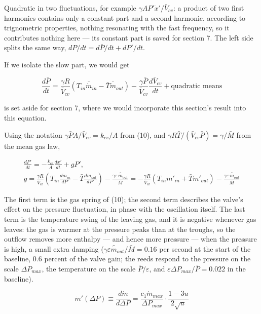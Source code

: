 \documentclass[11pt]{article}
\begin{document}
Quadratic in two fluctuations, for example $\gamma AP'\dot x'/\bar V_{cv}$: a product of two first harmonics contains only a constant part and a second harmonic, according to trignometric properties, nothing resonating with the fast frequency, so it contributes nothing here --- its constant part is saved for section 7. The left side splits the same way, $dP/dt = d\bar P/dt + dP'/dt$.

If we isolate the slow part, we would get

\[
\frac{d\bar P}{dt} = \frac{\gamma R}{\bar V_{cv}}\left(T_{in}\bar {\dot{m}}_{in} - \bar T\bar {\dot{m}}_{out}\right) - \frac{\gamma\bar P}{\bar V_{cv}}\frac{d\bar V_{cv}}{dt} + \text{quadratic means}
\]

is set aside for section 7, where we would incorporate this section's result into this equation.

Using the notation $\gamma\bar PA/\bar V_{cv} = k_{cv}/A$ from (10), and $\gamma R\bar T/(\bar V_{cv}\bar P) = \gamma/\bar M$ from the mean gas law,

\begin{equation}
\begin{gathered}
\frac{dP'}{dt} = -\frac{k_{cv}}{A}\frac{dx'}{dt} + gP', \\
g = \frac{\gamma R}{\bar V_{cv}}\left(T_{in}\frac{d\dot{m}_{in}}{dP'} - \bar T\frac{d\dot{m}_{out}}{dP'}\right) - \frac{\gamma\varepsilon\,\bar{\dot m}_{out}}{\bar M}
= -\frac{\gamma R}{\bar V_{cv}}\left(T_{in}\dot m'_{in} + \bar T\dot m'_{out}\right) - \frac{\gamma\varepsilon\,\bar{\dot m}_{out}}{\bar M}
\end{gathered} \tag{14}
\end{equation}

The first term is the gas spring of (10); the second term describes the valve's effect on the pressure fluctuation, in phase with the oscillation itself. The last term is the temperature swing of the leaving gas, and it is negative whenever gas leaves: the gas is warmer at the pressure peaks than at the troughs, so the outflow removes more enthalpy --- and hence more pressure --- when the pressure is high, a small extra damping ($\gamma\varepsilon\bar{\dot m}_{out}/\bar M = 0.16$ per second at the start of the baseline, 0.6 percent of the valve gain; the reeds respond to the pressure on the scale $\Delta P_{max}$, the temperature on the scale $\bar P/\varepsilon$, and $\varepsilon\Delta P_{max}/\bar P = 0.022$ in the baseline).

\begin{equation}
\dot m'(\Delta P) \equiv \frac{d\dot m}{d\Delta P} = \frac{c_1\dot m_{max}}{\Delta P_{max}}\cdot\frac{1 - 3u}{2\sqrt u} \tag{15}
\end{equation}
\end{document}
